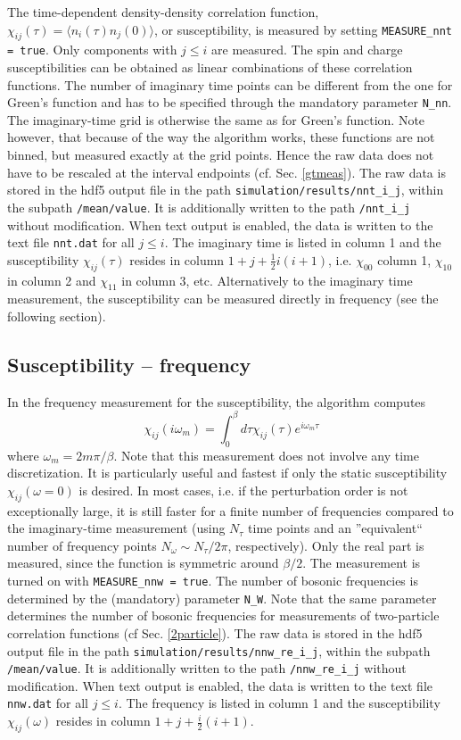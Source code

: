 \documentclass[aps,prb,floatfix,superscriptaddress,twocolumn,notitlepage]{revtex4-1}
\begin{document}
The time-dependent density-density correlation function, $\chi_{ij}(\tau)=\langle n_{i}(\tau)n_{j}(0)\rangle$, or susceptibility, is measured by setting \verb#MEASURE_nnt = true#. Only components with $j\leq i$ are measured. The spin and charge susceptibilities can be obtained as linear combinations of these correlation functions.
The number of imaginary time points can be different from the one for Green's function and has to be specified through the mandatory parameter \verb#N_nn#. The imaginary-time grid is otherwise the same as for Green's function. Note however, that because of the way the algorithm works, these functions are not binned, but measured exactly at the grid points. Hence the raw data does not have to be rescaled at the interval endpoints (cf. Sec. \ref{gtmeas}).
The raw data is stored in the hdf5 output file in the path \verb#simulation/results/nnt_i_j#, within the subpath \verb#/mean/value#. It is additionally written to the path \verb#/nnt_i_j# without modification.
When text output is enabled, the data is written to the text file \verb|nnt.dat| for all $j\leq i$. The imaginary time is listed in column 1 and the susceptibility $\chi_{ij}(\tau)$ resides in column $1+j+\frac{1}{2}i(i+1)$, i.e. $\chi_{00}$ column 1, $\chi_{10}$ in column 2 and $\chi_{11}$ in column 3, etc.
Alternatively to the imaginary time measurement, the susceptibility can be measured directly in frequency (see the following section).

\subsection{Susceptibility -- frequency}
In the frequency measurement for the susceptibility, the algorithm computes
\begin{equation}
\chi_{ij}(i\omega_{m}) = \int_{0}^{\beta} d\tau \chi_{ij}(\tau) e^{i\omega_{m}\tau}
\end{equation}
where $\omega_{m}=2m\pi/\beta$. Note that this measurement does not involve any time discretization. It is particularly useful and fastest if only the static susceptibility $\chi_{ij}(\omega=0)$ is desired.
In most cases, i.e. if the perturbation order is not exceptionally large, it is still faster for a finite number of frequencies compared to the imaginary-time measurement (using $N_{\tau}$ time points and an ''equivalent`` number of frequency points $N_{\omega}\sim N_{\tau}/2\pi$, respectively).
Only the real part is measured, since the function is symmetric around $\beta/2$.
The measurement is turned on with \verb#MEASURE_nnw = true#. The number of bosonic frequencies is determined by the (mandatory) parameter \verb#N_W#. Note that the same parameter determines the number of bosonic frequencies for measurements of two-particle correlation functions (cf Sec. \ref{2particle}).
The raw data is stored in the hdf5 output file in the path \verb#simulation/results/nnw_re_i_j#, within the subpath \verb#/mean/value#. It is additionally written to the path \verb#/nnw_re_i_j# without modification.
When text output is enabled, the data is written to the text file \verb|nnw.dat| for all $j\leq i$. The frequency is listed in column 1 and the susceptibility $\chi_{ij}(\omega)$ resides in column $1+j+\frac{i}{2}(i+1)$.
\end{document}
